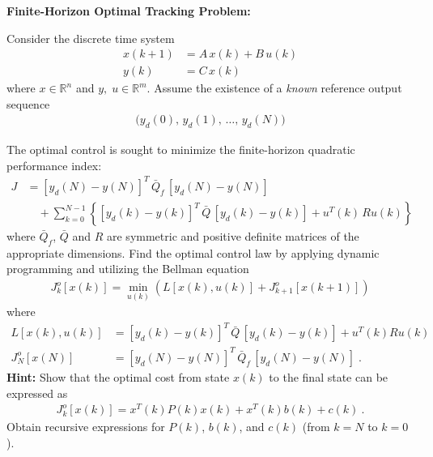 \item
{\bf Finite-Horizon Optimal Tracking Problem:}

Consider the discrete time system
\begin{align*}
    x(k+1) & = A\, x(k) + B \, u(k) \\
    y(k) & = C\, x(k)
\end{align*}
where $x \in \mathbb{R}^n$ and $y, \;u \in \mathbb{R}^m$.
Assume the existence of a {\em known} reference output sequence
\begin{align*}
    \big( y_d(0),\, y_d(1),\, \ldots,\, y_d(N) \big)
\end{align*}

The optimal control is sought to minimize the finite-horizon quadratic performance index:
\begin{align*}
    J & = [ y_d(N) - y(N) ]^T \, \bar{Q}_f \, [ y_d(N) - y(N) ] \\
    & \quad + \sum_{k=0}^{N-1} \left \{ [ y_d(k) - y(k) ]^T \, \bar{Q} \, [ y_d(k) - y(k) ]
        + u^T(k) \, R u(k) \right \}
\end{align*}
where $\bar{Q}_f$, $\bar{Q}$ and $R$ are symmetric and positive definite matrices of the appropriate
dimensions. Find the optimal control law by applying dynamic programming and utilizing the
Bellman equation
\begin{align*}
    J_k^o[x(k)] = \min_{u(k)} \left( L[x(k),u(k)] + J_{k+1}^o[x(k+1)] \right)
\end{align*}
where
\begin{align*}
    L[x(k),u(k)] & = [ y_d(k) - y(k) ]^T \, \bar{Q} \, [ y_d(k) - y(k) ] + u^T(k) R u(k) \\
    J_N^o[x(N)] & = [ y_d(N) - y(N) ]^T \, \bar{Q}_f \, [ y_d(N) - y(N) ] \; .
\end{align*}
\textbf{Hint:} Show that the optimal cost from state $x(k)$ to the final state can be expressed as
\begin{align*}
    J_k^o[x(k)] = x^T(k)P(k)x(k) + x^T(k)b(k) + c(k) \:.
\end{align*}
Obtain recursive expressions for $P(k)$, $b(k)$, and $c(k)$ (from $k=N$ to $k=0$).


